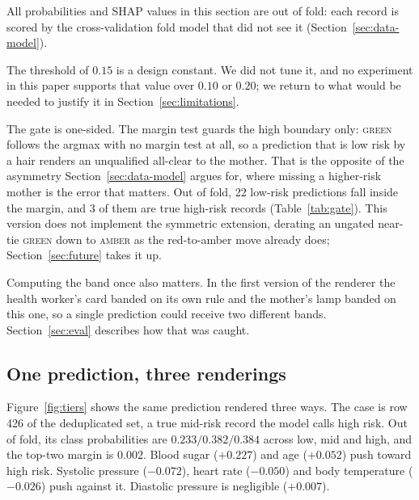 All probabilities and SHAP values in this section are out of fold: each record
is scored by the cross-validation fold model that did not see it
(Section~\ref{sec:data-model}).

The threshold of $0.15$ is a design constant. We did not tune it, and no
experiment in this paper supports that value over $0.10$ or $0.20$; we return
to what would be needed to justify it in Section~\ref{sec:limitations}.

The gate is one-sided. The margin test guards the high boundary only: \textsc{green}
follows the argmax with no margin test at all, so a prediction that is
low risk by a hair renders an unqualified all-clear to the mother. That is the
opposite of the asymmetry Section~\ref{sec:data-model} argues for, where
missing a higher-risk mother is the error that matters. Out of fold, 22
low-risk predictions fall inside the margin, and 3 of them are true high-risk
records (Table~\ref{tab:gate}). This version does not
implement the symmetric extension, derating an ungated near-tie
\textsc{green} down to \textsc{amber} as the red-to-amber move already does;
Section~\ref{sec:future} takes it up.

Computing the band once also matters. In the first version of the renderer
the health worker's card banded on its own rule and the mother's lamp banded
on this one, so a single prediction could receive two different bands. Section~\ref{sec:eval} describes how that was caught.

\subsection{One prediction, three renderings}
\label{sec:tiers-render}

Figure~\ref{fig:tiers} shows the same prediction rendered three ways. The
case is row 426 of the deduplicated set, a true mid-risk record the model
calls high risk. Out of fold, its class probabilities are
$0.233 / 0.382 / 0.384$ across low, mid and high, and the top-two margin is
$0.002$. Blood sugar ($+0.227$) and age ($+0.052$) push toward high risk.
Systolic pressure ($-0.072$), heart rate ($-0.050$) and body temperature
($-0.026$) push against it. Diastolic pressure is negligible ($+0.007$).

